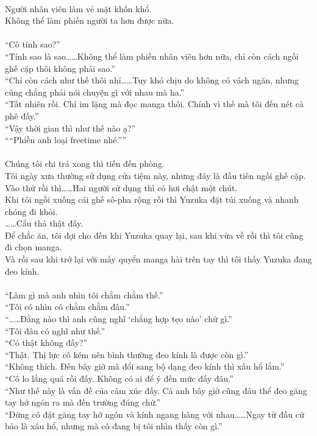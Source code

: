\documentclass[12pt,a4paper, twosides]{book}
\begin{document}
\\
Người nhân viên làm vẻ mặt khốn khổ.\\
Không thể làm phiền người ta hơn được nữa.\\
\\
“Cô tính sao?”\\
“Tính sao là sao……Không thể làm phiền nhân viên hơn nữa, chỉ còn cách ngồi ghế cặp thôi không phải sao.”\\
“Chỉ còn cách như thế thôi nhỉ……Tuy khó chịu do không có vách ngăn, nhưng cũng chẳng phải nói chuyện gì với nhau mà ha.”\\
“Tất nhiên rồi. Chỉ im lặng mà đọc manga thôi. Chính vì thế mà tôi đến nét cà phê đấy.”\\
“Vậy thời gian thì như thế nào ạ?”\\
““Phiền anh loại freetime nhé.””\\
\\
Chúng tôi chi trả xong thì tiến đến phòng.\\
Tôi ngày xưa thường sử dụng cửa tiệm này, nhưng đây là đầu tiên ngồi ghế cặp. Vào thử rồi thì……Hai người sử dụng thì có hơi chật một chút.\\
Khi tôi ngồi xuống cái ghế sô-pha rộng rồi thì Yuzuka đặt túi xuống và nhanh chóng đi khỏi.\\
……Cẩu thả thật đấy.\\
Để chắc ăn, tôi đợi cho đến khi Yuzuka quay lại, sau khi vừa về rồi thì tôi cũng đi chọn manga.\\
Và rồi sau khi trở lại với mấy quyển manga hài trên tay thì tôi thấy Yuzuka đang đeo kính.\\
\\
“Làm gì mà anh nhìn tôi chằm chằm thế.”\\
“Tôi có nhìn cô chằm chằm đâu.”\\
“……Đằng nào thì anh cũng nghĩ ‘chẳng hợp tẹo nào’ chứ gì.”\\
“Tôi đâu có nghĩ như thế.”\\
“Có thật không đấy?”\\
“Thật. Thị lực cô kém nên bình thường đeo kính là được còn gì.”\\
“Không thích. Đến bây giờ mà đổi sang bộ dạng đeo kính thì xấu hổ lắm.”\\
“Cô lo lắng quá rồi đấy. Không có ai để ý đến mức đấy đâu.”\\
“Như thế này là vấn đề của cảm xúc đấy. Cả anh bây giờ cũng đâu thể đeo găng tay hở ngón ra mà đến trường đúng chứ.”\\
“Đừng có đặt găng tay hở ngón và kính ngang hàng với nhau……Ngay từ đầu cứ bảo là xấu hổ, nhưng mà cô đang bị tôi nhìn thấy còn gì.”\\
\end{document}
